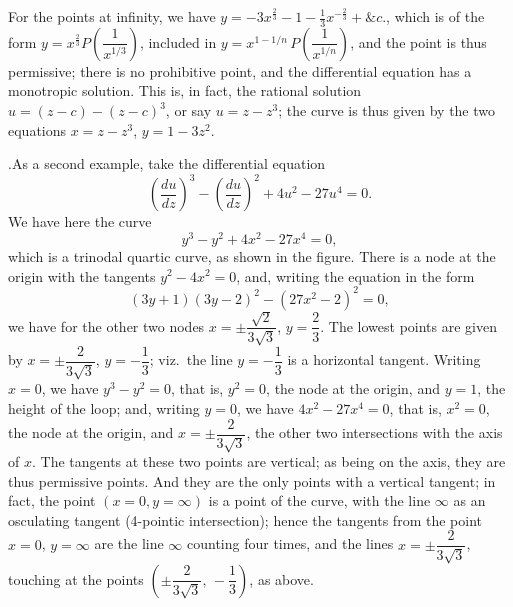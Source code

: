\documentclass[11pt]{article}
\begin{document}
\begin{center}
\end{center}

For the points at infinity, we have $y = -3x^{\frac{2}{3}} - 1 - \tfrac{1}{3}x^{-\frac{2}{3}} + \&c.$, which is of the form $y = x^{\frac{2}{3}}P\!\left(\dfrac{1}{x^{1/3}}\right)$, included in $y = x^{1-1/n}\,P\!\left(\dfrac{1}{x^{1/n}}\right)$, and the point is thus permissive; there is no prohibitive point, and the differential equation has a monotropic solution. This is, in fact, the rational solution $u = (z-c) - (z-c)^{3}$, or say $u = z - z^{3}$; the curve is thus given by the two equations $x = z - z^{3}$, $y = 1 - 3z^{2}$.

\medskip

.\quad As a second example, take the differential equation
\[
\left(\frac{du}{dz}\right)^{3} - \left(\frac{du}{dz}\right)^{2} + 4u^{2} - 27u^{4} = 0.
\]
We have here the curve
\[
y^{3} - y^{2} + 4x^{2} - 27x^{4} = 0,
\]
which is a trinodal quartic curve, as shown in the figure. There is a node at the origin with the tangents $y^{2} - 4x^{2} = 0$, and, writing the equation in the form
\[
(3y+1)(3y-2)^{2} - (27x^{2}-2)^{2} = 0,
\]
we have for the other two nodes $x = \pm \dfrac{\sqrt{2}}{3\sqrt{3}}$, $y = \dfrac{2}{3}$. The lowest points are given by $x = \pm \dfrac{2}{3\sqrt{3}}$, $y = -\dfrac{1}{3}$; viz.\ the line $y = -\dfrac{1}{3}$ is a horizontal tangent. Writing $x=0$, we have $y^{3} - y^{2} = 0$, that is, $y^{2} = 0$, the node at the origin, and $y=1$, the height of the loop; and, writing $y=0$, we have $4x^{2} - 27x^{4} = 0$, that is, $x^{2} = 0$, the node at the origin, and $x = \pm \dfrac{2}{3\sqrt{3}}$, the other two intersections with the axis of $x$. The tangents at these two points are vertical; as being on the axis, they are thus permissive points. And they are the only points with a vertical tangent; in fact, the point $(x=0, y=\infty)$ is a point of the curve, with the line $\infty$ as an osculating tangent (4-pointic intersection); hence the tangents from the point $x=0$, $y=\infty$ are the line $\infty$ counting four times, and the lines $x = \pm \dfrac{2}{3\sqrt{3}}$, touching at the points $\left(\pm \dfrac{2}{3\sqrt{3}},\, -\dfrac{1}{3}\right)$, as above.
\end{document}
